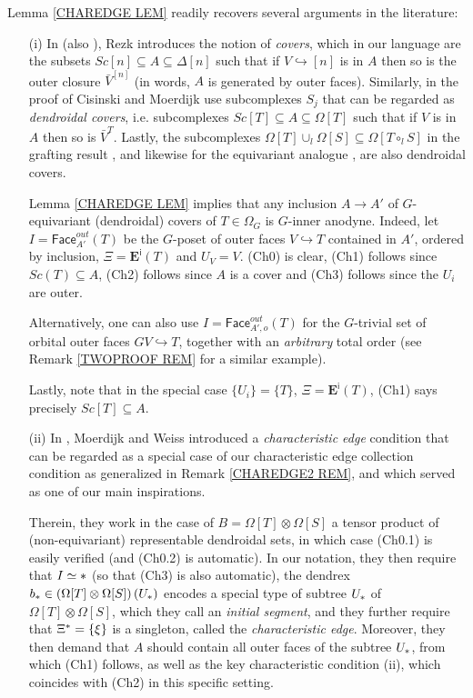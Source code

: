 \documentclass[a4paper,10pt
,draft
]{article}%
\begin{document}
\begin{remark} \label{RECOVER REM}
Lemma \ref{CHAREDGE LEM} readily recovers several arguments in the literature:
\begin{itemize}
\item[(i)] In \cite[\S 10]{Rez01} (also \cite[\S 6.2]{Rez10}), Rezk introduces the notion of \textit{covers}, which in our language are the subsets
$Sc[n] \subseteq A \subseteq \Delta[n]$
such that if $V \hookrightarrow [n]$ is in $A$ then so is the outer closure $\bar{V}^{[n]}$
(in words, $A$ is generated by outer faces).
Similarly, in the proof of \cite[Prop. 2.4]{CM13a}
Cisinski and Moerdijk use subcomplexes $S_j$ that can be regarded as
\textit{dendroidal covers},
i.e. subcomplexes
$Sc[T] \subseteq A \subseteq \Omega[T]$
such that if $V$ is in $A$ then so is $\bar{V}^{T}$.
Lastly, the subcomplexes 
$\Omega[T] \cup_l \Omega[S] \subseteq \Omega[T \circ_l S]$
in the grafting result \cite[Lemma 5.2]{MW09},
and likewise for the equivariant analogue \cite[Prop. 6.19]{Per17}, are also dendroidal covers.

Lemma \ref{CHAREDGE LEM} implies
that any inclusion $A \to A'$ of $G$-equivariant (dendroidal) covers of $T\in \Omega_G$
is $G$-inner anodyne. 
Indeed, let $I=\mathsf{Face}_{A'}^{out}(T)$ be the $G$-poset of outer faces $V \hookrightarrow T$ contained in $A'$, ordered by inclusion, 
$\Xi = \boldsymbol{E}^{\mathsf{i}}(T)$ and $U_V = V$.
(Ch0) is clear, (Ch1) follows since 
$Sc(T) \subseteq A$, (Ch2) follows since $A$ is a cover and
(Ch3) follows since the $U_i$ are outer.

Alternatively, one can also use $I=\mathsf{Face}_{A',o}^{out}(T)$
for the $G$-trivial set of orbital outer faces 
$GV \hookrightarrow T$,
together with an \textit{arbitrary} total order (see Remark \ref{TWOPROOF REM} for a similar example).

Lastly, note that in the special case 
$\{U_i\}=\{T\}$, $\Xi=\boldsymbol{E}^{\mathsf{i}}(T)$,
(Ch1) says precisely $Sc[T] \subseteq A$.


\item[(ii)] In \cite[Lemma 9.7]{MW09}, Moerdijk and Weiss introduced a \textit{characteristic edge} condition that can be regarded as a special case of our characteristic edge collection condition as generalized in Remark \ref{CHAREDGE2 REM}, and which served as one of our main inspirations.

Therein, they work in the case of $B= \Omega[T] \otimes \Omega[S]$
a tensor product of (non-equivariant) representable dendroidal sets, in which case (Ch0.1) is easily verified (and (Ch0.2) is automatic).
In our notation, they then require that $I \simeq \**$ (so that (Ch3) is also automatic), 
the dendrex 
$b_{\**} \in \left(\Omega[T] \otimes \Omega[S]\right)(U_{\**})$ encodes a special type of subtree $U_{\**}$ of $\Omega[T] \otimes \Omega[S]$, which they call an \textit{initial segment},
and they further require that $\Xi^{\**} = \{\xi\}$ is a singleton, called the \textit{characteristic edge}.
Moreover, they then demand that $A$ should contain all outer faces of the subtree $U_{\**}$, from which (Ch1) follows, 
as well as the key characteristic condition 
\cite[Lemma 9.7]{MW09}(ii),
which coincides with (Ch2) in this specific setting.


\end{itemize}
\end{remark}
\end{document}
